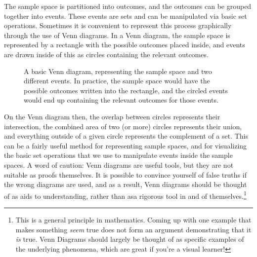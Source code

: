 \documentclass[
  letterpaper,
  DIV=11,
  numbers=noendperiod]{scrreprt}
\theoremstyle{definition}
\theoremstyle{definition}
\theoremstyle{definition}
\theoremstyle{remark}
\begin{document}
The sample space is partitioned into outcomes, and the outcomes can be
grouped together into events. These events are sets and can be
manipulated via basic set operations. Sometimes it is convenient to
represent this process graphically through the use of Venn diagrams. In
a Venn diagram, the sample space is represented by a rectangle with the
possible outcomes placed inside, and events are drawn inside of this as
circles containing the relevant outcomes.

\begin{figure}[H]

\caption{\label{fig-venn-diagram}A basic Venn diagram, representing the
sample space and two different events. In practice, the sample space
would have the possible outcomes written into the rectangle, and the
circled events would end up containing the relevant outcomes for those
events.}


\end{figure}%

On the Venn diagram then, the overlap between circles represents their
intersection, the combined area of two (or more) circles represents
their union, and everything outside of a given circle represents the
complement of a set. This can be a fairly useful method for representing
sample spaces, and for visualizing the basic set operations that we use
to manipulate events inside the sample spaces. A word of caution: Venn
diagrams are useful tools, but they are not suitable as proofs
themselves. It is possible to convince yourself of false truths if the
wrong diagrams are used, and as a result, Venn diagrams should be
thought of as aids to understanding, rather than asa rigorous tool in
and of themselves.\footnote{This is a general principle in mathematics.
  Coming up with one example that makes something \emph{seem} true does
  not form an argument demonstrating that it \emph{is} true. Venn
  Diagrams should largely be thought of as specific examples of the
  underlying phenomena, which are great if you're a visual learner!}
\end{document}
